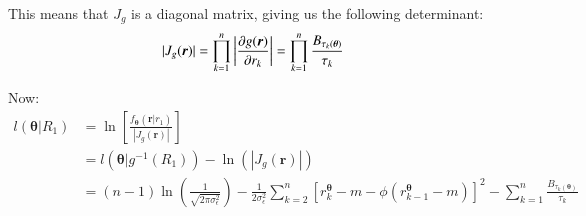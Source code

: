 This means that $J_{g}$ is a diagonal matrix, giving us the following determinant: 
\begin{align*}
|J_{g}(\bm{r})| 
&= 
\prod_{k=1}^{n}
\bigg{|}
\frac{\partial g(\bm{r})}{\partial r_{k}}
\bigg{|}
= 
\prod_{k=1}^{n}\frac{B_{\tau_{k}(\bm{\theta})}}{\tau_{k}}
\end{align*}

Now: 
\begin{align*}
l(\bm{\theta}|R_{1}) &= 
\ln\left[
\frac{
 f_{\bm{\theta}}(\bm{r}|r_{1})
 }{
 |J_{g}(\bm{r})|
 }  
\right] \\
&= 
l(\bm{\theta}|g^{-1}(R_{1})) - \ln(|J_{g}(\bm{r})|) \\ 
&= 
(n-1)\ln\left(
\frac{1}{
\sqrt{2\pi \sigma_{\epsilon}^{2}}
}
\right)
- \frac{1}{2\sigma_{\epsilon}^{2}}
\sum_{k=2}^{n}\left[
r_{k}^{\bm{\theta}} - m - \phi(r_{k-1}^{\bm{\theta}} -m)
\right]^{2}
- \sum_{k=1}^{n}\frac{B_{\tau_{k}(\bm{\theta})}}{\tau_{k}}
\end{align*}









